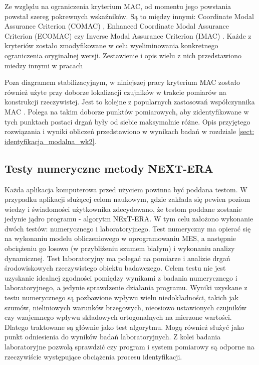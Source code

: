 Ze względu na ograniczenia kryterium MAC, od momentu jego powstania powstał szereg pokrewnych wskaźników. Są to między innymi: Coordinate Modal Assurance Criterion (COMAC) \parencite{Ewins2000}, Enhanced Coordinate Modal Assurance Criterion (ECOMAC) \parencite{Hunt1992} czy Inverse Modal Assurance Criterion (IMAC) \parencite{MITCHELL1998}. Każde z kryteriów zostało zmodyfikowane w celu wyeliminowania konkretnego ograniczenia oryginalnej wersji. Zestawienie i opis wielu z nich przedstawiono miedzy innymi w pracach \parencite{Allemang2003,Rainieri2014,Szafranski2013,Salamak2003} 

Poza diagramem stabilizacyjnym, w niniejszej pracy kryterium MAC zostało również użyte przy doborze lokalizacji czujników w trakcie pomiarów na konstrukcji rzeczywistej. Jest to kolejne z popularnych zastosowań współczynnika MAC \parencite{Allemang2003}. Polega na takim doborze punktów pomiarowych, aby zidentyfikowane w tych punktach postaci drgań były od siebie maksymalnie różne. Opis przyjętego rozwiązania i wyniki obliczeń przedstawiono w wynikach badań w rozdziale \ref{sect: identyfikacja_modalna_wk2}.




\subsection{Testy numeryczne metody NEXT-ERA}
Każda aplikacja komputerowa przed użyciem powinna być poddana testom. W przypadku aplikacji służącej celom naukowym, gdzie zakłada się pewien poziom wiedzy i świadomości użytkownika zdecydowano, że testom poddane zostanie jedynie jądro programu - algorytm NExT-ERA. W tym celu założono wykonanie dwóch testów: numerycznego i laboratoryjnego. Test numeryczny ma opierać się na wykonaniu modelu obliczeniowego w oprogramowaniu MES, a następnie obciążeniu go losowo (w przybliżeniu szumem białym) i wykonaniu analizy dynamicznej. Test laboratoryjny ma polegać na pomiarze i analizie drgań środowiskowych rzeczywistego obiektu badawczego. Celem testu nie jest uzyskanie idealnej zgodności pomiędzy wynikami z badania numerycznego i laboratoryjnego, a jedynie sprawdzenie działania programu. Wyniki uzyskane z testu numerycznego są pozbawione wpływu wielu niedokładności, takich jak szumów, nieliniowych warunków brzegowych, nieosiowo ustawionych czujników czy wzajemnego wpływu składowych ortogonalnych na mierzone wartości. Dlatego traktowane są głównie jako test algorytmu. Mogą również służyć jako punkt odniesienia do wyników badań laboratoryjnych. Z kolei badania laboratoryjne pozwolą sprawdzić czy program i system pomiarowy są odporne na rzeczywiście występujące obciążenia procesu identyfikacji.

